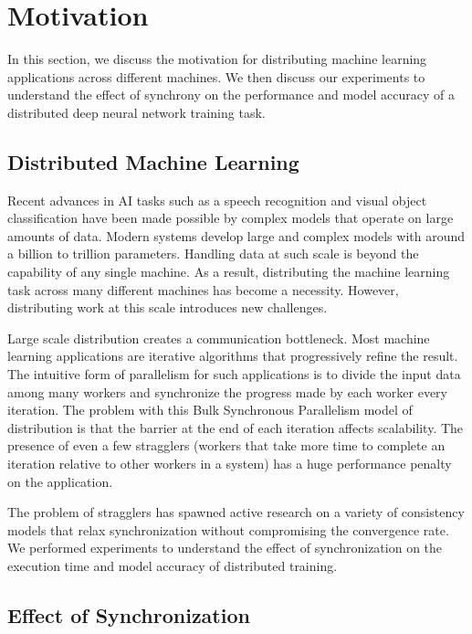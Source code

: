 \section{Motivation} \label{sec:motivation}

In this section, we discuss the motivation for distributing
machine learning applications across different machines.
We then discuss our experiments to understand the effect of
synchrony on the performance and model accuracy of a distributed
deep neural network training task.

\subsection{Distributed Machine Learning}

Recent advances in AI tasks such as a speech recognition and visual 
object classification have been made possible by complex models
that operate on large amounts of data. Modern systems \cite{distbelief}
\cite{projectadam}\cite{parameterserver} develop large and complex
models with around a billion to trillion parameters. Handling data
at such scale is beyond the capability of any single machine. As a 
result, distributing the machine learning task across many different
machines has become a necessity. However, distributing work at 
this scale introduces new challenges.

Large scale distribution creates a communication bottleneck. Most 
machine learning applications are iterative algorithms that progressively
refine the result. The intuitive form of parallelism for such 
applications is to divide the input data among many workers and 
synchronize the progress made by each worker every iteration. The 
problem with this Bulk Synchronous Parallelism model of distribution 
is that the barrier at the end of each iteration affects scalability.
The presence of even a few stragglers (workers that take more time
to complete an iteration relative to other workers in a system) 
has a huge performance penalty on the application.

The problem of stragglers has spawned active research on a variety
of consistency models that relax synchronization without compromising
the convergence rate\cite{communicationthesis}\cite{ganger}.
We performed experiments to understand the effect of synchronization 
on the execution time and model accuracy of distributed training.

\subsection{Effect of Synchronization}

